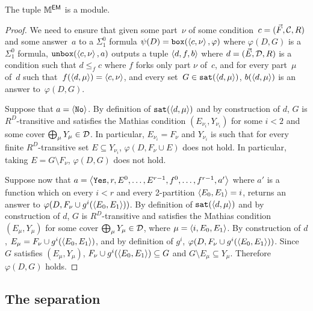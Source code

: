 \begin{lemma}
The tuple $\mathbb{M}^{\operatorname{\sf{EM}}}$ is a module.
\end{lemma}
\begin{proof}
We need to ensure that given some part~$\nu$ of some condition~$c = (\vec{F}, \mathcal{C}, R)$
and some answer~$a$ to a $\Sigma^0_1$ formula $\psi(D) = \mathtt{box}(\left\langle c,\nu \right\rangle, \varphi)$ where $\varphi(D, G)$ is a $\Sigma^0_1$ formula, 
$\mathtt{unbox}(\left\langle c,\nu \right\rangle, a)$ outputs a tuple $\left\langle d, f, b \right\rangle$ where $d = (\vec{E}, \mathcal{D}, R)$ is a condition such that 
$d \leq_f c$ where $f$ forks only part $\nu$ of~$c$,
and for every part~$\mu$ of~$d$ such that~$f(\left\langle d,\mu \right\rangle) = \left\langle c,\nu \right\rangle$, 
and every set~$G \in \mathtt{sat}(\left\langle d,\mu \right\rangle)$, $b(\left\langle d,\mu \right\rangle)$ is an answer to~$\varphi(D, G)$.

Suppose that $a = \left\langle \mathtt{No} \right\rangle$.
By definition of $\mathtt{sat}(\left\langle d,\mu \right\rangle)$ and by construction of $d$, $G$ is $R^D$-transitive and satisfies the Mathias condition
$(E_{\nu_i}, Y_{\nu_i})$ for some $i < 2$ and some cover $\bigoplus_\mu Y_\mu \in \mathcal{D}$.
In particular, $E_{\nu_i} = F_\nu$ and $Y_{\nu_i}$ is such that for every finite $R^D$-transitive set $E \subseteq Y_{\nu_i}$,
$\varphi(D, F_\nu \cup E)$ does not hold. In particular, taking $E = G \setminus F_\nu$, $\varphi(D, G)$ does not hold.

Suppose now that $a = \left\langle \mathtt{Yes}, r, E^0, \dots, E^{r-1}, f^0, \dots, f^{r-1}, a' \right\rangle$
where $a'$ is a function which on every $i < r$ and every 2-partition $\left\langle E_0, E_1 \right\rangle = i$,
returns an answer to $\varphi(D, F_\nu \cup g^i(\left\langle E_0, E_1 \right\rangle))$.
By definition of $\mathtt{sat}(\left\langle d,\mu \right\rangle)$ and by construction of $d$, $G$ is $R^D$-transitive and satisfies the Mathias condition
$(E_\mu, Y_\mu)$ for some cover $\bigoplus_\mu Y_\mu \in \mathcal{D}$, where $\mu = \left\langle i, E_0, E_1 \right\rangle$.
By construction of $d$, $E_\mu = F_\nu \cup g^i(\left\langle E_0,E_1 \right\rangle)$, and by definition of $g^i$,
$\varphi(D, F_\nu \cup g^i(\left\langle E_0,E_1 \right\rangle))$.  Since $G$ satisfies $(E_\mu, Y_\mu)$,
$F_\nu \cup g^i(\left\langle E_0,E_1 \right\rangle) \subseteq G$ and $G \setminus E_\mu \subseteq Y_\mu$. 
Therefore $\varphi(D, G)$ holds.
\end{proof}


\subsection{The separation}

